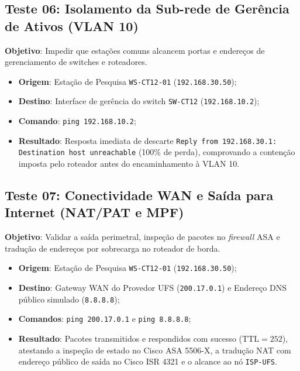 \subsection{Teste 06: Isolamento da Sub-rede de Gerência de Ativos (VLAN 10)}
\textbf{Objetivo}: Impedir que estações comuns alcancem portas e endereços de gerenciamento de switches e roteadores.
\begin{itemize}
    \item \textbf{Origem}: Estação de Pesquisa \texttt{WS-CT12-01} (\texttt{192.168.30.50});
    \item \textbf{Destino}: Interface de gerência do switch \texttt{SW-CT12} (\texttt{192.168.10.2});
    \item \textbf{Comando}: \texttt{ping 192.168.10.2};
    \item \textbf{Resultado}: Resposta imediata de descarte \texttt{Reply from 192.168.30.1: Destination host unreachable} (100\% de perda), comprovando a contenção imposta pelo roteador antes do encaminhamento à VLAN 10.
\end{itemize}

\subsection{Teste 07: Conectividade WAN e Saída para Internet (NAT/PAT e MPF)}
\textbf{Objetivo}: Validar a saída perimetral, inspeção de pacotes no \textit{firewall} ASA e tradução de endereços por sobrecarga no roteador de borda.
\begin{itemize}
    \item \textbf{Origem}: Estação de Pesquisa \texttt{WS-CT12-01} (\texttt{192.168.30.50});
    \item \textbf{Destino}: Gateway WAN do Provedor UFS (\texttt{200.17.0.1}) e Endereço DNS público simulado (\texttt{8.8.8.8});
    \item \textbf{Comandos}: \texttt{ping 200.17.0.1} e \texttt{ping 8.8.8.8};
    \item \textbf{Resultado}: Pacotes transmitidos e respondidos com sucesso ($\text{TTL} = 252$), atestando a inspeção de estado no Cisco ASA 5506-X, a tradução NAT com endereço público de saída no Cisco ISR 4321 e o alcance ao nó \texttt{ISP-UFS}.
\end{itemize}


